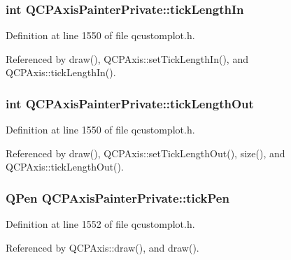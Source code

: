 \subsubsection[{tick\+Length\+In}]{\setlength{\rightskip}{0pt plus 5cm}int Q\+C\+P\+Axis\+Painter\+Private\+::tick\+Length\+In}\label{class_q_c_p_axis_painter_private_ae7360ff805fc6097019de8b35ffbd7e7}


Definition at line 1550 of file qcustomplot.\+h.



Referenced by draw(), Q\+C\+P\+Axis\+::set\+Tick\+Length\+In(), and Q\+C\+P\+Axis\+::tick\+Length\+In().

\hypertarget{class_q_c_p_axis_painter_private_acbebb1f868906200f968627bc907b77d}{}
\subsubsection[{tick\+Length\+Out}]{\setlength{\rightskip}{0pt plus 5cm}int Q\+C\+P\+Axis\+Painter\+Private\+::tick\+Length\+Out}\label{class_q_c_p_axis_painter_private_acbebb1f868906200f968627bc907b77d}


Definition at line 1550 of file qcustomplot.\+h.



Referenced by draw(), Q\+C\+P\+Axis\+::set\+Tick\+Length\+Out(), size(), and Q\+C\+P\+Axis\+::tick\+Length\+Out().

\hypertarget{class_q_c_p_axis_painter_private_a389dde97f02fdee23965e4736e7d8c62}{}
\subsubsection[{tick\+Pen}]{\setlength{\rightskip}{0pt plus 5cm}Q\+Pen Q\+C\+P\+Axis\+Painter\+Private\+::tick\+Pen}\label{class_q_c_p_axis_painter_private_a389dde97f02fdee23965e4736e7d8c62}


Definition at line 1552 of file qcustomplot.\+h.



Referenced by Q\+C\+P\+Axis\+::draw(), and draw().

\hypertarget{class_q_c_p_axis_painter_private_ae55e3dc2cf2af8d8a6e7235ccab54786}{}
